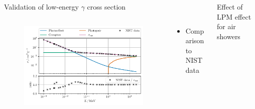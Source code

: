 \documentclass[t]{beamer}
\begin{document}
  \begin{columns}[onlytextwidth]%
    \begin{column}{0.4\textwidth}%
      \begin{block}[equal height group=PLOTS]{Validation of low-energy $\gamma$ cross section}%
        \begin{columns}[onlytextwidth]
            \begin{column}{0.6\textwidth}%
              \begin{figure}
                  \includegraphics[width=\linewidth, keepaspectratio]{../plots/photoeffect_nist.pdf}
                \end{figure}
            \end{column}
            \begin{column}{0.4\textwidth}%
              \begin{itemize}[leftmargin=1.5cm]
                \item Comparison to NIST data 
              \end{itemize}
            \end{column}            
        \end{columns}
      \end{block}
    \end{column}
    \begin{column}{0.6\textwidth}%
      \begin{block}[equal height group=PLOTS]{Effect of LPM effect for air showers}%
        \begin{columns}[onlytextwidth]
            \begin{column}{0.65\textwidth}%
              \begin{figure}
              \begin{minipage}[t]{0.49\textwidth}

\end{minipage}
\end{figure}
\end{column}
\end{columns}
\end{block}
\end{column}
\end{columns}
\end{document}
